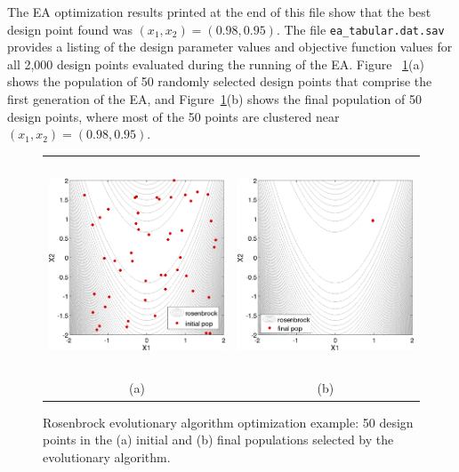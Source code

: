 The EA optimization results printed at the end of this file show that
the best design point found was $(x_1,x_2) = (0.98,0.95)$. The file
\texttt{ea\_tabular.dat.sav} provides a listing of the design
parameter values and objective function values for all 2,000 design
points evaluated during the running of the EA. Figure~
\ref{opt:methods:gradientfree:global:example:rosenbrock_ea_graphics}(a)
shows the population of 50 randomly selected design points that
comprise the first generation of the EA, and
Figure~\ref{opt:methods:gradientfree:global:example:rosenbrock_ea_graphics}(b)
shows the final population of 50 design points, where most of the 50
points are clustered near $(x_1,x_2) = (0.98,0.95)$.

\begin{figure}[hbt!]
  \centering
  \begin{tabular}{cc}
  \includegraphics[height=2.5in]{images/rosen_ea_init} &
  \includegraphics[height=2.5in]{images/rosen_ea_final} \\
  (a) & (b)
  \end{tabular}
  \caption{Rosenbrock evolutionary algorithm optimization example: 50
    design points in the (a) initial and (b) final populations
    selected by the evolutionary algorithm. }
  \label{opt:methods:gradientfree:global:example:rosenbrock_ea_graphics}
\end{figure}

